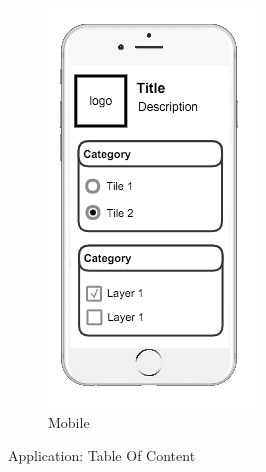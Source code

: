 \begin{figure}[ht]
\begin{subfigure}[b]{0.2\textwidth}
        \includegraphics[width=\textwidth]
          {img/c02-application/png/mobile-basemap-toc.png}
        \caption{Mobile}
    \end{subfigure}
    \caption{Application: Table Of Content}
\end{figure}


